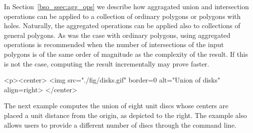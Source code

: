 In Section~\ref{bso_ssec:agg_ops} we describe how aggragated union
and intersection operations can be applied to a collection of ordinary
polygons or polygons with holes. Naturally, the aggregated operations
can be applied also to collections of general polygons. As was the
case with ordinary polygons, using aggregated operations is
recommended when the number of intersections of the input polygons
is of the same order of magnitude as the complexity of the result. If
this is not the case, computing the result incrementally may prove
faster.

\lcTex{%
  \setlength{\widthRight}{3.4cm}
  \setlength{\widthLeft}{\widthLineReal}
  \addtolength{\widthLeft}{-\widthRight}
  \begin{minipage}{\widthLeft}
}
\label{fig:disks}
\begin{ccHtmlOnly}
  <p><center>
    <img src="./fig/disks.gif" border=0 alt="Union of disks" align=right>
  </center>
\end{ccHtmlOnly}
The next example computes the union of eight unit discs whose centers are
placed a unit distance from the origin, as depicted to the right. The example
also allows users to provide a different number of discs through the command
line.

